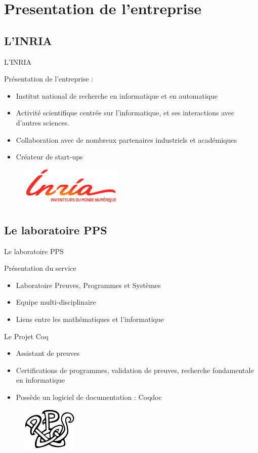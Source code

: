 \documentclass[compress]{beamer}
\newenvironment{tframe}[1]{
  \subsection{#1}
  \begin{frame}{#1}
  }{
  \end{frame}
  }
\begin{document}
\section{Presentation de l'entreprise}
\begin{tframe}{L'INRIA}
  Présentation de l'entreprise :
  \begin{itemize}
    \item Institut national de recherche en informatique et en automatique
    \item Activité scientifique centrée sur l'informatique, et ses interactions
      avec d'autres sciences.
    \item Collaboration avec de nombreux partenaires industriels et académiques
    \item Créateur de start-ups
  \end{itemize}
  \begin{figure}
        \includegraphics[scale=0.4]{../data/inria.jpg}
  \end{figure}
\end{tframe}
\begin{tframe}{Le laboratoire PPS}
  Présentation du service
  \begin{itemize}
    \item Laboratoire Preuves, Programmes et Systèmes
    \item Equipe multi-disciplinaire
    \item Liens entre les mathématiques et l'informatique
  \end{itemize}

  \medskip

  Le Projet Coq
  \begin{itemize}
    \item Assistant de preuves
    \item Certifications de programmes, validation de preuves, recherche
      fondamentale en informatique
    \item Possède un logiciel de documentation : Coqdoc
  \end{itemize}
  \begin{figure}
        \includegraphics[scale=0.6]{../data/pps.png}
  \end{figure}
\end{tframe}
\end{document}
